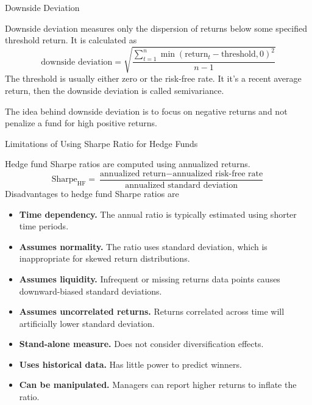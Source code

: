 \documentclass[../custom]{flashcards}
\begin{document}
\begin{flashcard}{Downside Deviation}
    \begin{flushleft}
        Downside deviation measures only the dispersion of returns below some specified threshold return. It is calculated as
        \[
            \text{downside deviation} = \sqrt{\frac{\sum_{t=1}^n \min(\text{return}_t - \text{threshold}, 0)^2}{n - 1}}
        \]
        The threshold is usually either zero or the risk-free rate. It it's a recent average return, then the downside deviation is called semivariance.\newline

        The idea behind downside deviation is to focus on negative returns and not penalize a fund for high positive returns.
    \end{flushleft}
\end{flashcard}

\begin{flashcard}{Limitations of Using Sharpe Ratio for Hedge Funds}
    \begin{flushleft}
        Hedge fund Sharpe ratios are computed using annualized returns.
        \[
            \text{Sharpe}_{\text{HF}} = \frac{\text{annualized return} - \text{annualized risk-free rate}}{\text{annualized standard deviation}}
        \]
        Disadvantages to hedge fund Sharpe ratios are
        \begin{itemize}
            \item \textbf{Time dependency.} The annual ratio is typically estimated using shorter time periods.
            \item \textbf{Assumes normality.} The ratio uses standard deviation, which is inappropriate for skewed return distributions.
            \item \textbf{Assumes liquidity.} Infrequent or missing returns data points causes downward-biased standard deviations.
            \item \textbf{Assumes uncorrelated returns.} Returns correlated across time will artificially lower standard deviation.
            \item \textbf{Stand-alone measure.} Does not consider diversification effects.
            \item \textbf{Uses historical data.} Has little power to predict winners.
            \item \textbf{Can be manipulated.} Managers can report higher returns to inflate the ratio.
        \end{itemize}
    \end{flushleft}
\end{flashcard}
\end{document}
